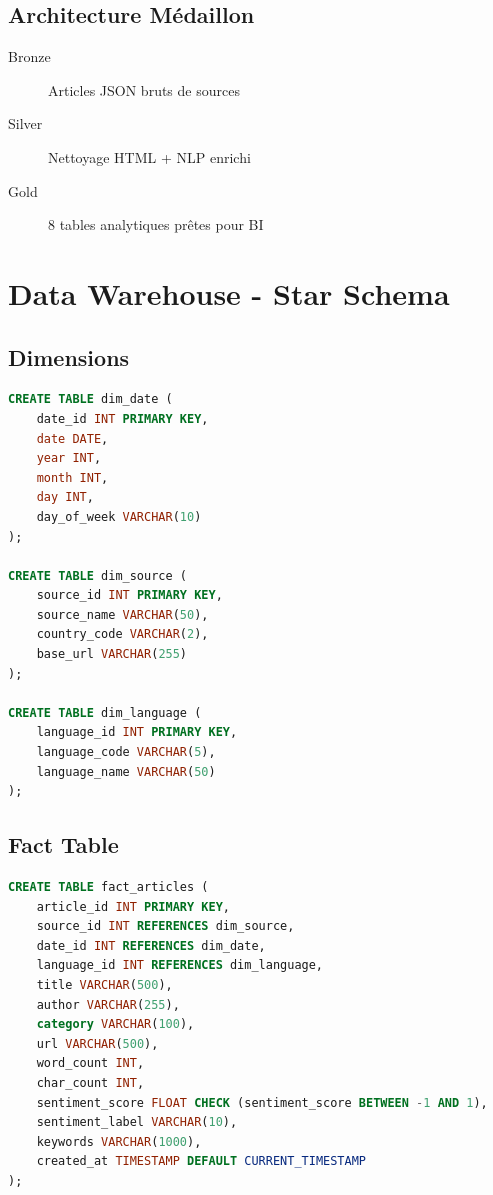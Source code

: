 \documentclass[12pt,a4paper]{report}
\begin{document}
\subsection{Architecture Médaillon}

\begin{description}
    \item[Bronze] Articles JSON bruts de sources
    \item[Silver] Nettoyage HTML + NLP enrichi
    \item[Gold] 8 tables analytiques prêtes pour BI
\end{description}

\section{Data Warehouse - Star Schema}

\subsection{Dimensions}

\begin{lstlisting}[language=sql]
CREATE TABLE dim_date (
    date_id INT PRIMARY KEY,
    date DATE,
    year INT,
    month INT,
    day INT,
    day_of_week VARCHAR(10)
);

CREATE TABLE dim_source (
    source_id INT PRIMARY KEY,
    source_name VARCHAR(50),
    country_code VARCHAR(2),
    base_url VARCHAR(255)
);

CREATE TABLE dim_language (
    language_id INT PRIMARY KEY,
    language_code VARCHAR(5),
    language_name VARCHAR(50)
);
\end{lstlisting}

\subsection{Fact Table}

\begin{lstlisting}[language=sql]
CREATE TABLE fact_articles (
    article_id INT PRIMARY KEY,
    source_id INT REFERENCES dim_source,
    date_id INT REFERENCES dim_date,
    language_id INT REFERENCES dim_language,
    title VARCHAR(500),
    author VARCHAR(255),
    category VARCHAR(100),
    url VARCHAR(500),
    word_count INT,
    char_count INT,
    sentiment_score FLOAT CHECK (sentiment_score BETWEEN -1 AND 1),
    sentiment_label VARCHAR(10),
    keywords VARCHAR(1000),
    created_at TIMESTAMP DEFAULT CURRENT_TIMESTAMP
);
\end{lstlisting}
\end{document}
